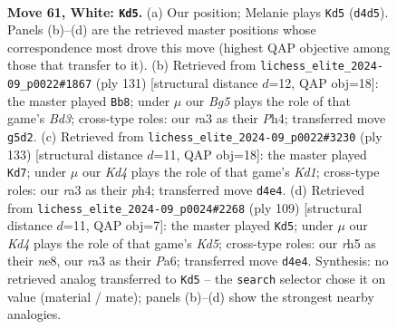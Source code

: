 \documentclass[11pt]{article}
\begin{document}
\clearpage

\begin{figure}[p]\centering
\begin{subfigure}{0.46\textwidth}\centering
\resizebox{\linewidth}{!}{%
\newchessgame
\chessboard[
  setfen={8/3k4/3P4/1p4Br/3K4/r7/1p6/8 w - - 4 61},
  showmover=false,
  pgfstyle=straightmove, color=movearrow, markmove={d4-d5}
]}
\caption{}
\end{subfigure}\hfill
\begin{subfigure}{0.46\textwidth}\centering
\resizebox{\linewidth}{!}{%
\newchessgame
\chessboard[
  setfen={8/8/2Rb4/8/4K2p/1P6/5k2/8 b - - 27 66},
  showmover=false,
  pgfstyle=straightmove, color=movearrow, markmove={d6-b8}
]}
\caption{}
\end{subfigure}
\\[4pt]
\begin{subfigure}{0.46\textwidth}\centering
\resizebox{\linewidth}{!}{%
\newchessgame
\chessboard[
  setfen={3k4/6K1/8/7p/7P/3bR3/8/8 b - - 32 67},
  showmover=false,
  pgfstyle=straightmove, color=movearrow, markmove={d8-d7}
]}
\caption{}
\end{subfigure}\hfill
\begin{subfigure}{0.46\textwidth}\centering
\resizebox{\linewidth}{!}{%
\newchessgame
\chessboard[
  setfen={1b2N3/8/p1P5/6Kp/1P1k4/8/8/8 b - - 0 55},
  showmover=false,
  pgfstyle=straightmove, color=movearrow, markmove={d4-d5}
]}
\caption{}
\end{subfigure}
\caption{\textbf{Move 61, White: \texttt{Kd5}.} (a) Our position; Melanie plays \texttt{Kd5} (\texttt{d4d5}). Panels (b)--(d) are the retrieved master positions whose correspondence most drove this move (highest QAP objective among those that transfer to it). (b) Retrieved from \texttt{lichess\_elite\_2024-09\_p0022\#1867} (ply 131) [structural distance $d$=12, QAP obj=18]: the master played \texttt{Bb8}; under $\mu$ our \emph{Bg5} plays the role of that game's \emph{Bd3}; cross-type roles: our \emph{r}a3 as their \emph{P}h4; transferred move \texttt{g5d2}. (c) Retrieved from \texttt{lichess\_elite\_2024-09\_p0022\#3230} (ply 133) [structural distance $d$=11, QAP obj=18]: the master played \texttt{Kd7}; under $\mu$ our \emph{Kd4} plays the role of that game's \emph{Kd1}; cross-type roles: our \emph{r}a3 as their \emph{p}h4; transferred move \texttt{d4e4}. (d) Retrieved from \texttt{lichess\_elite\_2024-09\_p0024\#2268} (ply 109) [structural distance $d$=11, QAP obj=7]: the master played \texttt{Kd5}; under $\mu$ our \emph{Kd4} plays the role of that game's \emph{Kd5}; cross-type roles: our \emph{r}h5 as their \emph{n}e8, our \emph{r}a3 as their \emph{P}a6; transferred move \texttt{d4e4}. Synthesis: no retrieved analog transferred to \texttt{Kd5} -- the \texttt{search} selector chose it on value (material / mate); panels (b)--(d) show the strongest nearby analogies.}
\label{fig:thought-m120}
\end{figure}
\end{document}
